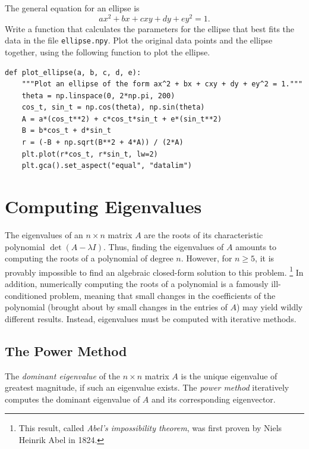 \begin{problem}
\label{prob:lstsq-ellipse-fit}
The general equation for an ellipse is \[ax^2 + bx + cxy + dy + ey^2 = 1.\]
Write a function that calculates the parameters for the ellipse that best fits the data in the file \texttt{ellipse.npy}.
Plot the original data points and the ellipse together, using the following function to plot the ellipse.

\begin{lstlisting}
def plot_ellipse(a, b, c, d, e):
    """Plot an ellipse of the form ax^2 + bx + cxy + dy + ey^2 = 1."""
    theta = np.linspace(0, 2*np.pi, 200)
    cos_t, sin_t = np.cos(theta), np.sin(theta)
    A = a*(cos_t**2) + c*cos_t*sin_t + e*(sin_t**2)
    B = b*cos_t + d*sin_t
    r = (-B + np.sqrt(B**2 + 4*A)) / (2*A)
    plt.plot(r*cos_t, r*sin_t, lw=2)
    plt.gca().set_aspect("equal", "datalim")
\end{lstlisting}
\end{problem}

\section*{Computing Eigenvalues} %

The eigenvalues of an $n \times n$ matrix $A$ are the roots of its characteristic polynomial $\det(A - \lambda I)$.
Thus, finding the eigenvalues of $A$ amounts to computing the roots of a polynomial of degree $n$.
However, for $n \ge 5$, it is provably impossible to find an algebraic closed-form solution to this problem.%
\footnote{This result, called \emph{Abel's impossibility theorem}, was first proven by Niels Heinrik Abel in 1824.}
In addition, numerically computing the roots of a polynomial is a famously ill-conditioned problem, meaning that small changes in the coefficients of the polynomial (brought about by small changes in the entries of $A$) may yield wildly different results.
Instead, eigenvalues must be computed with iterative methods.

\subsection*{The Power Method} %

The \emph{dominant eigenvalue} of the $n \times n$ matrix $A$ is the unique eigenvalue of greatest magnitude, if such an eigenvalue exists.
The \emph{power method} iteratively computes the dominant eigenvalue of $A$ and its corresponding eigenvector.

